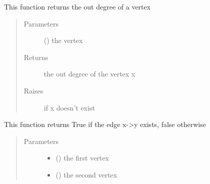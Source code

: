 \documentclass[letterpaper,10pt,english]{sphinxmanual}
\begin{document}
\begin{fulllineitems}
\begin{fulllineitems}
\begin{quote}
\begin{description}
\end{description}\end{quote}

\end{fulllineitems}


\begin{fulllineitems}
\label{\detokenize{Graph:Graph.Graph.get_out_degree}}
This function returns the out degree of a vertex
\begin{quote}\begin{description}
\item[{Parameters}] \leavevmode
{} () \textendash{} the vertex

\item[{Returns}] \leavevmode
the out degree of the vertex x

\item[{Raises}] \leavevmode
{} \textendash{} if x doesn’t exist

\end{description}\end{quote}

\end{fulllineitems}


\begin{fulllineitems}
\label{\detokenize{Graph:Graph.Graph.is_edge}}
This function returns True if the edge x-\textgreater{}y exists, false otherwise
\begin{quote}\begin{description}
\item[{Parameters}] \leavevmode\begin{itemize}
\item {} 
 () \textendash{} the first vertex

\item {} 
 () \textendash{} the second vertex


\end{itemize}
\end{description}
\end{quote}
\end{fulllineitems}
\end{fulllineitems}
\end{document}
